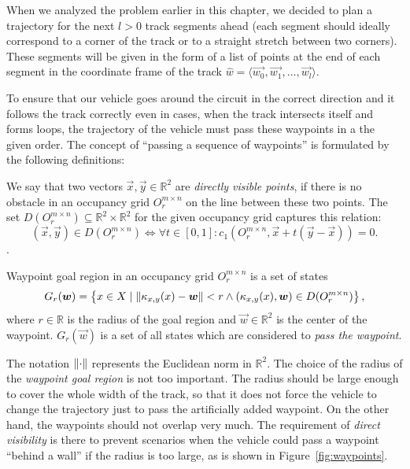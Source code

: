 When we analyzed the problem earlier in this chapter, we decided to plan a trajectory for the next $l>0$ track segments ahead (each segment should ideally correspond to a corner of the track or to a straight stretch between two corners). These segments will be given in the form of a list of points at the end of each segment in the coordinate frame of the track $\hat{w}=\langle \vec{w_0}, \vec{w_1}, \ldots, \vec{w_l} \rangle$.

To ensure that our vehicle goes around the circuit in the correct direction and it follows the track correctly even in cases, when the track intersects itself and forms loops, the trajectory of the vehicle must pass these waypoints in a the given order. The concept of ``passing a sequence of waypoints'' is formulated by the following definitions:

\begin{defn}
	We say that two vectors $\vec{x},\vec{y}\in\mathbb{R}^2$ are \textit{directly visible points}, if there is no obstacle in an occupancy grid $O_r^{m\times n}$ on the line between these two points. The set $D(O_r^{m\times n})\subseteq \mathbb{R}^2\times\mathbb{R}^2$ for the given occupancy grid captures this relation:
	\[
		(\vec{x}, \vec{y}) \in D(O_r^{m\times n}) \iff \forall t \in \left[0, 1\right]: c_1(O_{r}^{m\times n}, \vec{x} + t(\vec{y}-\vec{x})) = 0.
	\]
\label{def:directly_visible_points}.
\end{defn}

\begin{defn}[Waypoint]
	Waypoint goal region in an occupancy grid $O_r^{m\times n}$ is a set of states
	\[
		G_r(\bm{w})=\left\{x\in X \mid \left\lVert\kappa_{x,y}(x)-\bm{w}\right\rVert<r \land (\kappa_{x,y}(x), \bm{w}) \in D(O_r^{m\times n}) \right\},
	\]
	where $r\in \mathbb{R}$ is the radius of the goal region and $\vec{w}\in\mathbb{R}^2$ is the center of the waypoint. $G_r(\vec{w})$ is a set of all states which are considered to \textit{pass the waypoint}.
\end{defn}

The notation $\left\lVert\cdot\right\rVert$ represents the Euclidean norm in $\mathbb{R}^2$. The choice of the radius of the \textit{waypoint goal region} is not too important. The radius should be large enough to cover the whole width of the track, so that it does not force the vehicle to change the trajectory just to pass the artificially added waypoint. On the other hand, the waypoints should not overlap very much. The requirement of \textit{direct visibility} is there to prevent scenarios when the vehicle could pass a waypoint ``behind a wall'' if the radius is too large, as is shown in Figure~\ref{fig:waypoints}.

